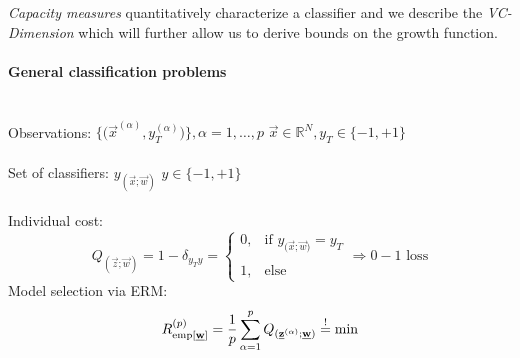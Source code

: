 \emph{Capacity measures} quantitatively characterize a classifier and
we describe the \emph{VC-Dimension} which will further allow us to
derive bounds on the growth function.


\paragraph{General classification problems}\mbox{}\\
Observations: $\Big\{ \Big( \vec{x}^{(\alpha)}, y_T^{(\alpha)} \Big) \Big\}, \alpha = 1, \ldots, p$ \indent $\vec{x} \in \mathbb{R}^N, y_T \in \{-1,+1\}$\\\\
Set of classifiers: $y_{(\vec{x}; \vec{w})}$ \indent $y \in \{-1,+1\}$\\\\
Individual cost:
\begin{equation}
	Q_{(\vec{z};\vec{w})} = 1 - \delta_{y_T y} = 
	\left \{ \begin{array}{ll}
		0, & \text{if } y_{(\vec{x};{\vec{w})}} = y_T \\\\
		1, & \text{else}
	\end{array} \right. 
	\Rightarrow 0 - 1 \text{ loss}
\end{equation}
Model selection via ERM:
\begin{equation}
	R_{\operatorname{emp} [\underline{\mathbf{w}}]}^{(p)} = \frac{1}{p} \sum_{\alpha = 1}^p 
		Q_{(\underline{\mathbf{z}}^{(\alpha)};\underline{\mathbf{w}})} \stackrel{\mathrm{!}}{=} \min
\end{equation}
